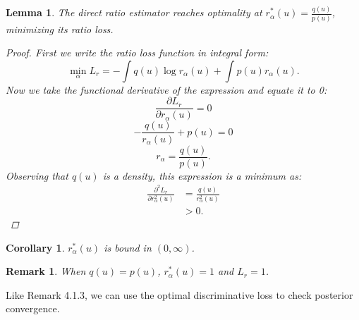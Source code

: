 \documentclass[honours,12pt]{unswthesis}
\newtheorem{lemma}[theorem]{Lemma}
\newtheorem{corollary}[theorem]{Corollary}
\newtheorem{remark}[theorem]{Remark}
\numberwithin{equation}{section}
\theoremstyle{definition}
\begin{document}
\begin{lemma}
The direct ratio estimator reaches optimality at $r^*_\alpha(u)=\frac{q(u)}{p(u)}$, minimizing its ratio loss.
\begin{proof}
First we write the ratio loss function in integral form:
\[\min_\alpha L_r=-\int q(u)\log r_\alpha(u)+\int p(u)r_\alpha(u).\]
Now we take the functional derivative of the expression and equate it to 0:
\[\frac{\partial L_r}{\partial r_\alpha(u)}=0\]
\[-\frac{q(u)}{r_\alpha (u)}+p(u)=0\]
\[r_\alpha=\frac{q(u)}{p(u)}.\]
Observing that $q(u)$ is a density, this expression is a minimum as:
\begin{align*}
\frac{\partial^2L_r}{\partial r_\alpha^2(u)}&=\frac{q(u)}{r_\alpha^2(u)}\\
&>0.
\end{align*}
\end{proof}
\end{lemma}
\begin{corollary}
$r_\alpha^*(u)$ is bound in $(0,\infty)$.
\end{corollary}
\begin{remark}
When $q(u)=p(u)$, $r^*_\alpha(u)=1$ and $L_r=1$.
\end{remark}
Like Remark 4.1.3, we can use the optimal discriminative loss to check posterior convergence.
\newpage
\end{document}
